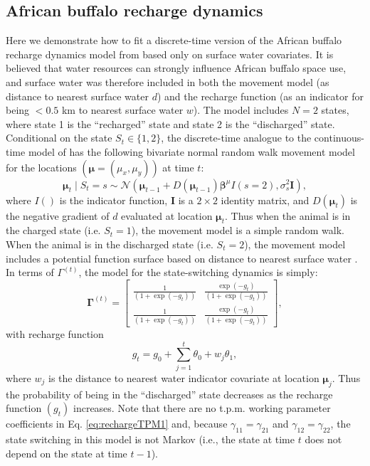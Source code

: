 \documentclass[12pt]{article}\usepackage[]{graphicx}\usepackage[]{xcolor}
\begin{document}
\subsection{African buffalo recharge dynamics}
\label{sec:buffalo}
Here we demonstrate how to fit a discrete-time version of the African buffalo recharge dynamics model from \cite{HootenEtAl2019} based only on surface water covariates. It is believed that water resources can strongly influence African buffalo space use, and surface water was therefore included in both the movement model (as distance to nearest surface water $d$) and the recharge function (as an indicator for being $<0.5$ km to nearest surface water $w$). The model includes $N=2$ states, where state 1 is the ``recharged'' state and state 2 is the ``discharged'' state. Conditional on the state $S_t \in \{1,2\}$, the discrete-time analogue to the continuous-time model of \cite{HootenEtAl2019} has the following bivariate normal random walk movement model for the locations $({\boldsymbol \mu}=(\mu_x,\mu_y))$ at time $t$:
\begin{equation*}
  {\boldsymbol \mu}_t \mid S_t=s \sim \mathcal{N}\left( {\boldsymbol \mu}_{t-1}+D({\boldsymbol \mu}_{t-1}){\boldsymbol \beta}^\mu I(s=2),\sigma_s^2 {\mathbf I} \right),
\end{equation*}
where $I()$ is the indicator function, $\mathbf I$ is a $2 \times 2$ identity matrix, and $D({\boldsymbol \mu}_t)$ is the negative gradient of $d$ evaluated at location ${\boldsymbol \mu}_t$. %
Thus when the animal is in the charged state (i.e. $S_t=1$), the movement model is a simple random walk. When the animal is in the discharged state (i.e. $S_t=2$), the movement model includes a potential function surface based on distance to nearest surface water \citep[for more on potential functions see][and sections \ref{sec:turtle} and \ref{sec:avoidLand}]{BrillingerEtAl2012,HootenEtAl2017,HootenEtAl2019}. In terms of $\Gamma^{(t)}$, the model for the state-switching dynamics is simply:
\begin{equation}
  {\mathbf \Gamma^{(t)}} = \begin{bmatrix}
    \frac{1}{(1+\exp(-g_t))} & \frac{\exp(-g_t)}{(1+\exp(-g_t))}  \\
    \frac{1}{(1+\exp(-g_t))} & \frac{\exp(-g_t)}{(1+\exp(-g_t))} 
  \end{bmatrix},
  \label{eq:rechargeTPM1}
\end{equation}
with recharge function
\begin{equation*}
  g_t = g_0 + \sum_{j=1}^t \theta_0 + w_j \theta_1,
\end{equation*}
where $w_j$ is the distance to nearest water indicator covariate at location ${\boldsymbol \mu}_j$. Thus the probability of being in the ``discharged'' state decreases as the recharge function $(g_t)$ increases. Note that there are no t.p.m. working parameter coefficients in Eq. \ref{eq:rechargeTPM1} and, because $\gamma_{11}=\gamma_{21}$ and $\gamma_{12}=\gamma_{22}$, the state switching in this model is not Markov (i.e., the state at time $t$ does not depend on the state at time $t-1$). 
\end{document}
